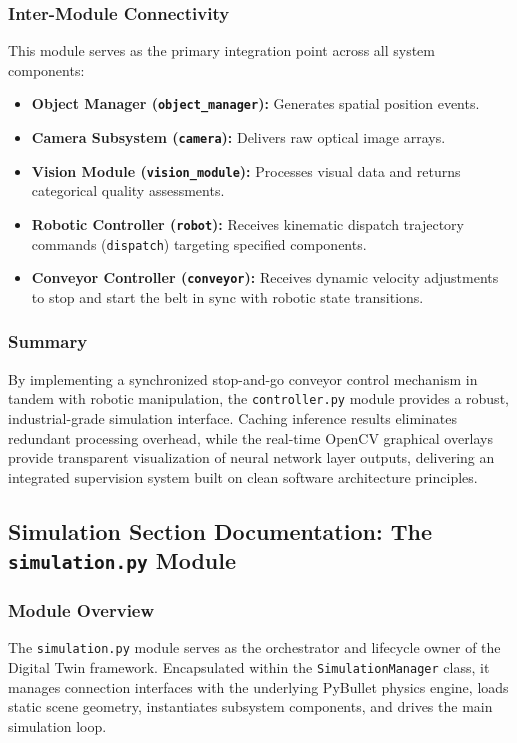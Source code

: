 \documentclass{article}
\begin{document}
\subsubsection{Inter-Module Connectivity}
This module serves as the primary integration point across all system components:

\begin{itemize}
	\item \textbf{Object Manager (\texttt{object\_manager}):} Generates spatial position events.
	\item \textbf{Camera Subsystem (\texttt{camera}):} Delivers raw optical image arrays.
	\item \textbf{Vision Module (\texttt{vision\_module}):} Processes visual data and returns categorical quality assessments.
	\item \textbf{Robotic Controller (\texttt{robot}):} Receives kinematic dispatch trajectory commands (\texttt{dispatch}) targeting specified components.
	\item \textbf{Conveyor Controller (\texttt{conveyor}):} Receives dynamic velocity adjustments to stop and start the belt in sync with robotic state transitions.
\end{itemize}

\subsubsection{Summary}
By implementing a synchronized stop-and-go conveyor control mechanism in tandem with robotic manipulation, the \texttt{controller.py} module provides a robust, industrial-grade simulation interface. Caching inference results eliminates redundant processing overhead, while the real-time OpenCV graphical overlays provide transparent visualization of neural network layer outputs, delivering an integrated supervision system built on clean software architecture principles.



\subsection{Simulation Section Documentation: The \texttt{simulation.py} Module}

\subsubsection{Module Overview}
The \texttt{simulation.py} module serves as the orchestrator and lifecycle owner of the Digital Twin framework. Encapsulated within the \texttt{SimulationManager} class, it manages connection interfaces with the underlying PyBullet physics engine, loads static scene geometry, instantiates subsystem components, and drives the main simulation loop.
\end{document}

